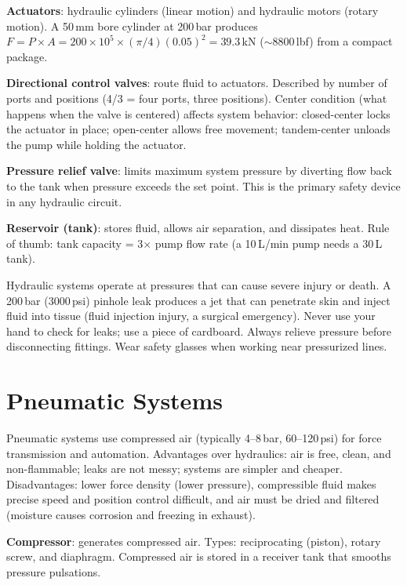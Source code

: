 \documentclass[11pt,letterpaper,twoside,openany]{book}
\begin{document}
\textbf{Actuators}: hydraulic cylinders (linear motion) and hydraulic motors (rotary motion). A 50\,mm bore cylinder at 200\,bar produces $F = P \times A = 200 \times 10^5 \times (\pi/4)(0.05)^2 = 39.3$\,kN ($\sim$8800\,lbf) from a compact package.

\textbf{Directional control valves}: route fluid to actuators. Described by number of ports and positions (4/3 = four ports, three positions). Center condition (what happens when the valve is centered) affects system behavior: closed-center locks the actuator in place; open-center allows free movement; tandem-center unloads the pump while holding the actuator.

\textbf{Pressure relief valve}: limits maximum system pressure by diverting flow back to the tank when pressure exceeds the set point. This is the primary safety device in any hydraulic circuit.

\textbf{Reservoir (tank)}: stores fluid, allows air separation, and dissipates heat. Rule of thumb: tank capacity = 3$\times$ pump flow rate (a 10\,L/min pump needs a 30\,L tank).

\begin{warningbox}
Hydraulic systems operate at pressures that can cause severe injury or death. A 200\,bar (3000\,psi) pinhole leak produces a jet that can penetrate skin and inject fluid into tissue (fluid injection injury, a surgical emergency). Never use your hand to check for leaks; use a piece of cardboard. Always relieve pressure before disconnecting fittings. Wear safety glasses when working near pressurized lines.
\end{warningbox}

\section{Pneumatic Systems}

Pneumatic systems use compressed air (typically 4--8\,bar, 60--120\,psi) for force transmission and automation. Advantages over hydraulics: air is free, clean, and non-flammable; leaks are not messy; systems are simpler and cheaper. Disadvantages: lower force density (lower pressure), compressible fluid makes precise speed and position control difficult, and air must be dried and filtered (moisture causes corrosion and freezing in exhaust).

\textbf{Compressor}: generates compressed air. Types: reciprocating (piston), rotary screw, and diaphragm. Compressed air is stored in a receiver tank that smooths pressure pulsations.
\end{document}
